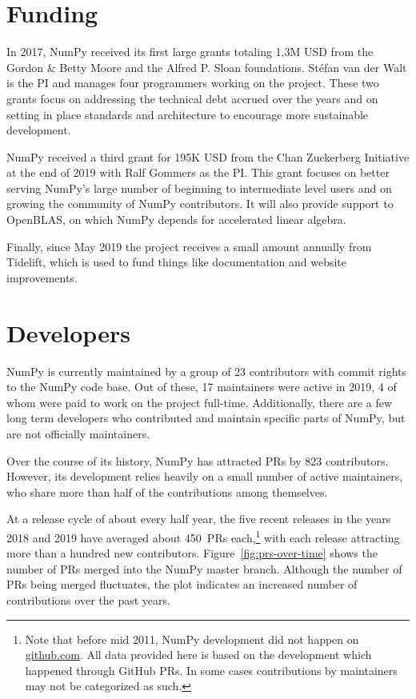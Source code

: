 \documentclass{article}
\begin{document}
\section*{Funding}

In 2017, NumPy received its first large grants totaling 1.3M USD from the
Gordon \& Betty Moore and the Alfred P. Sloan foundations.
Stéfan van der Walt is the PI and manages four programmers working on the project.
These two grants focus on addressing the technical debt accrued over the years and
on setting in place standards and architecture to encourage more sustainable development.

NumPy received a third grant for 195K USD from the Chan Zuckerberg
Initiative at the end of 2019 with Ralf Gommers as the PI.
This grant focuses on better serving NumPy's large number of beginning
to intermediate level users and on growing the community of NumPy
contributors.
It will also provide support to OpenBLAS, on which NumPy depends for
accelerated linear algebra.

Finally, since May 2019 the project receives a small amount annually from
Tidelift, which is used to fund things like documentation and website
improvements.


\section*{Developers}

NumPy is currently maintained by a group of 23 contributors with commit rights
to the NumPy code base. Out of these, 17 maintainers were active in
2019, 4 of whom were paid to work on the project full-time.
Additionally, there are a few long term developers who contributed and maintain
specific parts of NumPy, but are not officially maintainers.

Over the course of its history, NumPy has attracted PRs by 823 contributors.
However, its development relies heavily on a small number
of active maintainers, who share more than half of the contributions among
themselves.

At a release cycle of about every half year, the five recent releases in the years
2018 and 2019 have averaged about 450~PRs each,\footnote{
    Note that before mid 2011, NumPy development did not happen on \url{github.com}.
    All data provided here is based on the development which happened through GitHub
    PRs. In some cases contributions by maintainers may not be categorized as such.}
with each release attracting more than a hundred new contributors.
Figure~\ref{fig:prs-over-time} shows the number of PRs merged into the NumPy
master branch.
Although the number of PRs being merged fluctuates,
the plot indicates an increased number of contributions over the past
years.
\end{document}
